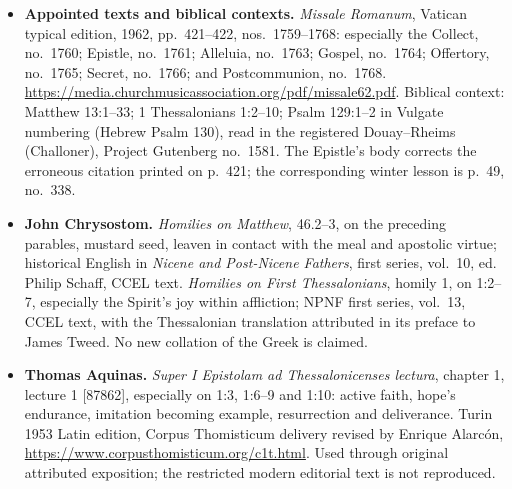 \begin{itemize}
\item \textbf{Appointed texts and biblical contexts.} \textit{Missale Romanum}, Vatican typical edition, 1962, pp.~421--422, nos.~1759--1768: especially the Collect, no.~1760; Epistle, no.~1761; Alleluia, no.~1763; Gospel, no.~1764; Offertory, no.~1765; Secret, no.~1766; and Postcommunion, no.~1768. \url{https://media.churchmusicassociation.org/pdf/missale62.pdf}. Biblical context: Matthew 13:1--33; 1 Thessalonians 1:2--10; Psalm 129:1--2 in Vulgate numbering (Hebrew Psalm 130), read in the registered Douay--Rheims (Challoner), Project Gutenberg no.~1581. The Epistle's body corrects the erroneous citation printed on p.~421; the corresponding winter lesson is p.~49, no.~338.

\item \textbf{John Chrysostom.} \textit{Homilies on Matthew}, 46.2--3, on the preceding parables, mustard seed, leaven in contact with the meal and apostolic virtue; historical English in \textit{Nicene and Post-Nicene Fathers}, first series, vol.~10, ed. Philip Schaff, CCEL text. \textit{Homilies on First Thessalonians}, homily 1, on 1:2--7, especially the Spirit's joy within affliction; NPNF first series, vol.~13, CCEL text, with the Thessalonian translation attributed in its preface to James Tweed. No new collation of the Greek is claimed.

\item \textbf{Thomas Aquinas.} \textit{Super I Epistolam ad Thessalonicenses lectura}, chapter 1, lecture 1 [87862], especially on 1:3, 1:6--9 and 1:10: active faith, hope's endurance, imitation becoming example, resurrection and deliverance. Turin 1953 Latin edition, Corpus Thomisticum delivery revised by Enrique Alarc\'on, \url{https://www.corpusthomisticum.org/c1t.html}. Used through original attributed exposition; the restricted modern editorial text is not reproduced.
\end{itemize}
